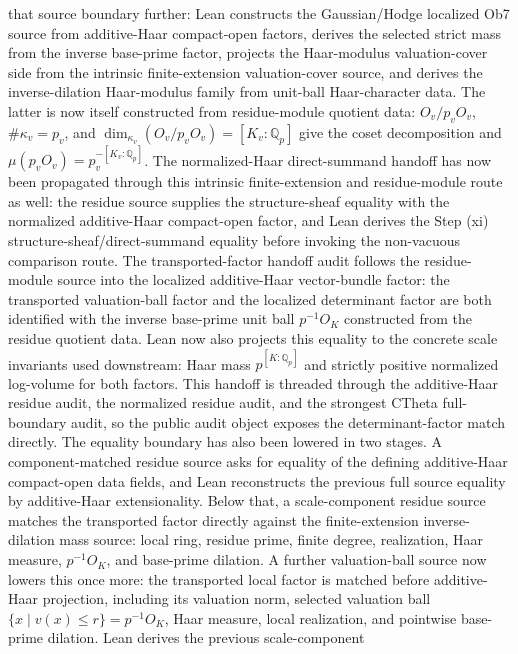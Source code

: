 \documentclass[11pt]{article}
\theoremstyle{plain}
\theoremstyle{definition}
\theoremstyle{remark}
\begin{document}
that source boundary further: Lean constructs the Gaussian/Hodge localized
Ob7 source from additive-Haar compact-open factors, derives the selected
strict mass from the inverse base-prime factor, projects the Haar-modulus
valuation-cover side from the intrinsic finite-extension valuation-cover
  source, and derives the inverse-dilation Haar-modulus family from unit-ball
  Haar-character data.  The latter is now itself constructed from residue-module
  quotient data: \(O_v/p_vO_v\), \(\#\kappa_v=p_v\), and
  \(\dim_{\kappa_v}(O_v/p_vO_v)=[K_v:\mathbb Q_p]\) give the coset
  decomposition and \(\mu(p_vO_v)=p_v^{-[K_v:\mathbb Q_p]}\).  The
  normalized-Haar direct-summand handoff has now been propagated through this
  intrinsic finite-extension and residue-module route as well: the residue
  source supplies the structure-sheaf equality with the normalized
  additive-Haar compact-open factor, and Lean derives the Step (xi)
  structure-sheaf/direct-summand equality before invoking the non-vacuous
  comparison route.  The transported-factor handoff audit follows the
  residue-module source into the localized additive-Haar vector-bundle factor:
  the transported valuation-ball factor and the localized determinant factor
  are both identified with the inverse base-prime unit ball \(p^{-1}O_K\)
  constructed from the residue quotient data.  Lean now also projects this
  equality to the concrete scale invariants used downstream: Haar mass
  \(p^{[K:\mathbb Q_p]}\) and strictly positive normalized log-volume for both
  factors.  This handoff is threaded through the additive-Haar residue audit,
  the normalized residue audit, and the strongest CTheta full-boundary audit,
  so the public audit object exposes the determinant-factor match directly.
  The equality boundary has also been lowered in two stages.  A
  component-matched residue source asks for equality of the defining
  additive-Haar compact-open data fields, and Lean reconstructs the previous
  full source equality by additive-Haar extensionality.  Below that, a
  scale-component residue source matches the transported factor directly
  against the finite-extension inverse-dilation mass source: local ring,
  residue prime, finite degree, realization, Haar measure, \(p^{-1}O_K\), and
  base-prime dilation.  A further valuation-ball source now lowers this once
  more: the transported local factor is matched before additive-Haar projection,
  including its valuation norm, selected valuation ball
  \(\{x\mid v(x)\le r\}=p^{-1}O_K\), Haar measure, local realization, and
  pointwise base-prime dilation.  Lean derives the previous scale-component
\end{document}
